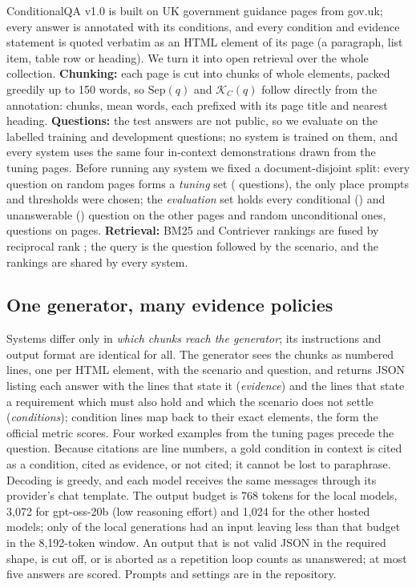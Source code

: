 ConditionalQA v1.0 \cite{sun2022conditionalqa} is built on \nPages{} UK government guidance pages from gov.uk; every answer is annotated with its conditions, and every condition and evidence statement is quoted verbatim as an HTML element of its page (a paragraph, list item, table row or heading). We turn it into open retrieval over the whole collection. \textbf{Chunking:} each page is cut into chunks of whole elements, packed greedily up to 150 words, so $\mathrm{Sep}(q)$ and $\mathcal{K}_C(q)$ follow directly from the annotation: \nChunks{} chunks, mean \chunkWords{} words, each prefixed with its page title and nearest heading. \textbf{Questions:} the test answers are not public, so we evaluate on the labelled training and development questions; no system is trained on them, and every system uses the same four in-context demonstrations drawn from the tuning pages. Before running any system we fixed a document-disjoint split: every question on \nTuningPages{} random pages forms a \emph{tuning} set (\nTuning{} questions), the only place prompts and thresholds were chosen; the \emph{evaluation} set holds every conditional (\nEvalCond{}) and unanswerable (\nEvalUnans{}) question on the other pages and \nEvalUncond{} random unconditional ones, \nEval{} questions on \nEvalPages{} pages. \textbf{Retrieval:} BM25 \cite{robertson2009bm25} and Contriever \cite{izacard2022contriever} rankings are fused by reciprocal rank \cite{cormack2009rrf}; the query is the question followed by the scenario, and the rankings are shared by every system.

\subsection{One generator, many evidence policies}

Systems differ only in \emph{which chunks reach the generator}; its instructions and output format are identical for all. The generator sees the chunks as numbered lines, one per HTML element, with the scenario and question, and returns JSON listing each answer with the lines that state it (\emph{evidence}) and the lines that state a requirement which must also hold and which the scenario does not settle (\emph{conditions}); condition lines map back to their exact elements, the form the official metric scores. Four worked examples from the tuning pages precede the question. Because citations are line numbers, a gold condition in context is cited as a condition, cited as evidence, or not cited; it cannot be lost to paraphrase. Decoding is greedy, and each model receives the same messages through its provider's chat template. The output budget is 768 tokens for the local models, 3{,}072 for gpt-oss-20b (low reasoning effort) and 1{,}024 for the other hosted models; only \nNearWindow{} of the \nLocalAnswers{} local generations had an input leaving less than that budget in the 8{,}192-token window. An output that is not valid JSON in the required shape, is cut off, or is aborted as a repetition loop counts as unanswered; at most five answers are scored. Prompts and settings are in the repository.

